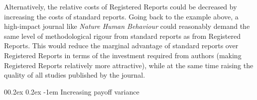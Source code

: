 \documentclass[
  ,man,mask,floatsintext]{apa6}
\makeatletter
\let\oldparagraph\paragraph
\renewcommand{\paragraph}[1]{\oldparagraph{#1}\mbox{}}
\renewcommand{\paragraph}{\@startsection{paragraph}{4}{\parindent}%
  {0\baselineskip \@plus 0.2ex \@minus 0.2ex}%
  {-1em}%
  {\normalfont\normalsize\bfseries\itshape\typesectitle}}
\makeatother
\begin{document}
Alternatively, the relative costs of Registered Reports could be decreased by increasing the costs of standard reports.
Going back to the example above, a high-impact journal like \emph{Nature Human Behaviour} could reasonably demand the same level of methodological rigour
from standard reports as from Registered Reports.
This
would reduce the marginal advantage of standard reports over Registered Reports in terms of the investment required from authors (making Registered Reports relatively more attractive), while at the same time raising the quality of all studies published by the journal.

\par\vspace{0.2\baselineskip}

\hypertarget{increasing-payoff-variance}{%
\paragraph{Increasing payoff variance}\label{increasing-payoff-variance}}
\end{document}
